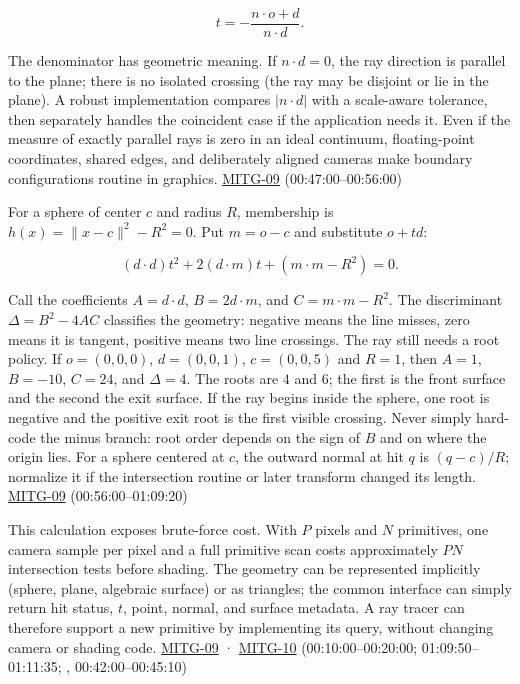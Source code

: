 \[
t=-\frac{n\cdot o+d}{n\cdot d}.
\]

The denominator has geometric meaning. If \(n\cdot d=0\), the ray direction is parallel to the plane; there is no isolated crossing (the ray may be disjoint or lie in the plane). A robust implementation compares \(|n\cdot d|\) with a scale-aware tolerance, then separately handles the coincident case if the application needs it. Even if the measure of exactly parallel rays is zero in an ideal continuum, floating-point coordinates, shared edges, and deliberately aligned cameras make boundary configurations routine in graphics. \hyperref[04-visual-computing-ii-ch036]{MITG-09} (00:47:00--00:56:00)

For a sphere of center \(c\) and radius \(R\), membership is \(h(x)=\|x-c\|^2-R^2=0\). Put \(m=o-c\) and substitute \(o+td\):

\[
(d\cdot d)t^2+2(d\cdot m)t+(m\cdot m-R^2)=0.
\]

Call the coefficients \(A=d\cdot d\), \(B=2d\cdot m\), and \(C=m\cdot m-R^2\). The discriminant \(\Delta=B^2-4AC\) classifies the geometry: negative means the line misses, zero means it is tangent, positive means two line crossings. The ray still needs a root policy. If \(o=(0,0,0)\), \(d=(0,0,1)\), \(c=(0,0,5)\) and \(R=1\), then \(A=1\), \(B=-10\), \(C=24\), and \(\Delta=4\). The roots are \(4\) and \(6\); the first is the front surface and the second the exit surface. If the ray begins inside the sphere, one root is negative and the positive exit root is the first visible crossing. Never simply hard-code the minus branch: root order depends on the sign of \(B\) and on where the origin lies. For a sphere centered at \(c\), the outward normal at hit \(q\) is \((q-c)/R\); normalize it if the intersection routine or later transform changed its length. \hyperref[04-visual-computing-ii-ch036]{MITG-09} (00:56:00--01:09:20)

This calculation exposes brute-force cost. With \(P\) pixels and \(N\) primitives, one camera sample per pixel and a full primitive scan costs approximately \(PN\) intersection tests before shading. The geometry can be represented implicitly (sphere, plane, algebraic surface) or as triangles; the common interface can simply return hit status, \(t\), point, normal, and surface metadata. A ray tracer can therefore support a new primitive by implementing its query, without changing camera or shading code. \hyperref[04-visual-computing-ii-ch036]{MITG-09} · \hyperref[04-visual-computing-ii-ch036]{MITG-10} (00:10:00--00:20:00; 01:09:50--01:11:35; , 00:42:00--00:45:10)


